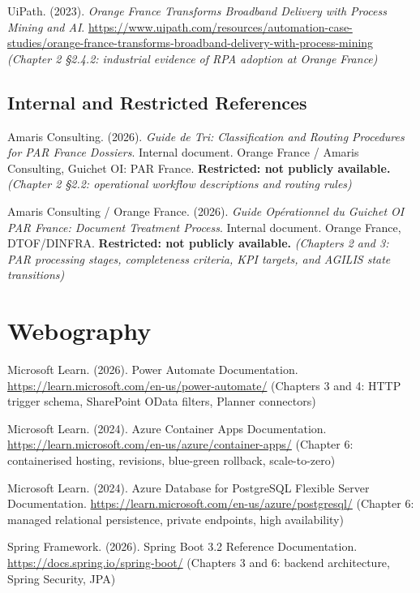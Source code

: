 UiPath. (2023). \textit{Orange France Transforms Broadband Delivery with Process Mining and AI}. \url{https://www.uipath.com/resources/automation-case-studies/orange-france-transforms-broadband-delivery-with-process-mining} \textit{(Chapter 2 \S{}2.4.2: industrial evidence of RPA adoption at Orange France)}

\bigskip

\subsection*{Internal and Restricted References}

Amaris Consulting. (2026). \textit{Guide de Tri: Classification and Routing Procedures for PAR France Dossiers}. Internal document. Orange France / Amaris Consulting, Guichet OI: PAR France. \textbf{Restricted: not publicly available.} \textit{(Chapter 2 \S{}2.2: operational workflow descriptions and routing rules)}

Amaris Consulting / Orange France. (2026). \textit{Guide Opérationnel du Guichet OI PAR France: Document Treatment Process}. Internal document. Orange France, DTOF/DINFRA. \textbf{Restricted: not publicly available.} \textit{(Chapters 2 and 3: PAR processing stages, completeness criteria, KPI targets, and AGILIS state transitions)}

\section*{Webography}

Microsoft Learn. (2026). Power Automate Documentation. \url{https://learn.microsoft.com/en-us/power-automate/} (Chapters 3 and 4: HTTP trigger schema, SharePoint OData filters, Planner connectors)

Microsoft Learn. (2024). Azure Container Apps Documentation. \url{https://learn.microsoft.com/en-us/azure/container-apps/} (Chapter 6: containerised hosting, revisions, blue-green rollback, scale-to-zero)

Microsoft Learn. (2024). Azure Database for PostgreSQL Flexible Server Documentation. \url{https://learn.microsoft.com/en-us/azure/postgresql/} (Chapter 6: managed relational persistence, private endpoints, high availability)

Spring Framework. (2026). Spring Boot 3.2 Reference Documentation. \url{https://docs.spring.io/spring-boot/} (Chapters 3 and 6: backend architecture, Spring Security, JPA)

